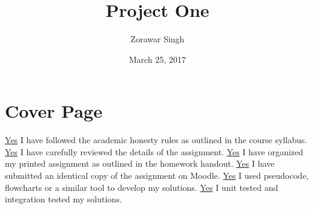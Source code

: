\documentclass{article}
\title{Project One}
\author{Zorawar Singh}
\date{March 25, 2017}
\begin{document}
\section{Cover Page}
\underline{Yes} I have followed the academic honesty rules as outlined in the course syllabus.\newline
\underline{Yes} I have carefully reviewed the details of the assignment. \newline
\underline{Yes} I have organized my printed assignment as outlined in the homework handout.\newline
\underline{Yes} I have submitted an identical copy of the assignment on Moodle. \newline
\underline{Yes} I used pseudocode, flowcharts or a similar tool to develop my solutions. \newline
\underline{Yes} I unit tested and integration tested my solutions.
\end{document}
